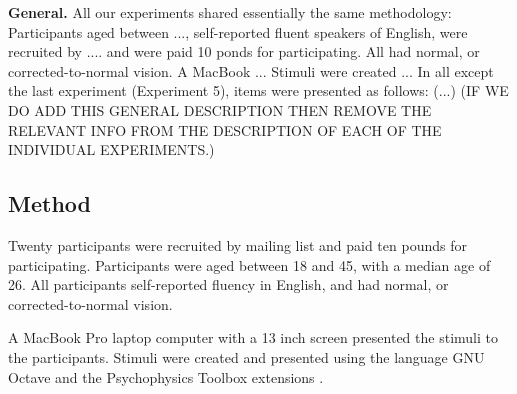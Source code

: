 \documentclass[doc,apacite]{apa6}
\begin{document}


{\bf General.} All our experiments shared essentially the same methodology: Participants aged between ..., self-reported fluent speakers of English, were recruited by .... and were paid 10 ponds for participating. All had normal, or corrected-to-normal vision. A MacBook ... Stimuli were created ... In all except the last experiment (Experiment 5), items were presented as follows: (...) (IF WE DO ADD THIS GENERAL DESCRIPTION THEN REMOVE THE RELEVANT INFO FROM THE DESCRIPTION OF EACH OF THE INDIVIDUAL EXPERIMENTS.)

\subsection{Method}
Twenty participants were recruited by mailing list and paid ten pounds for participating. Participants were aged between 18 and 45, with a median age of 26. All participants self-reported fluency in English, and had normal, or corrected-to-normal vision.

A MacBook Pro laptop computer with a 13 inch screen presented the stimuli to the participants. Stimuli were created and presented using the language GNU Octave \cite{eaton:2002} and the Psychophysics Toolbox extensions \cite{ptbx1, ptbx2}.

\end{document}
